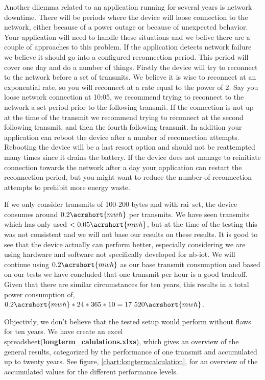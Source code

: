 \documentclass[USenglish]{ifimaster}  %
\begin{document}
Another dilemma related to an application running for several years is network downtime. There will be periods where the device will loose connection to the network, either because of a power outage or because of unexpected behavior. Your application will need to handle these situations and we belive there are a couple of approaches to this problem. If the application detects network failure we believe it should go into a configured reconnection period. This period will cover one day and do a number of things. Firstly the device will try to reconnect to the network before a set of transmits. We believe it is wise to reconnect at an exponential rate, so you will reconnect at a rate equal to the power of 2. Say you loose network connection at 10:05, we recommend trying to reconnect to the network a set period prior to the following transmit. If the connection is not up at the time of the transmit we recommend trying to reconnect at the second following transmit, and then the fourth following transmit. In addition your application can reboot the device after a number of reconnection attempts. Rebooting the device will be a last resort option and should not be reattempted many times since it drains the battery. If the device does not manage to reinitiate connection towards the network after a day your application can restart the reconnection period, but you might want to reduce the number of reconnection attempts to prehibit more energy waste.

If we only consider transmits of 100-200 bytes and with \acrshort{rai} set, the device consumes around ${0.2 \acrshort{mwh}}$ per transmits\cite{online:result8}. We have seen transmits which has only used ${<0.05 \acrshort{mwh}}$\cite{online:result12}, but at the time of the testing this was not consistent and we will not base our results on these results. It is good to see that the device actually can perform better, especially considering we are using hardware and software not specifically developed for \acrshort{nb-iot}.
We will continue using ${0.2 \acrshort{mwh}}$ as our base transmit consumption and based on our tests we have concluded that one transmit per hour is a good tradeoff. Given that there are similar circumstances for ten years, this results in a total power consumption of, ${0.2\acrshort{mwh} * 24 * 365 * 10 = 17 520 \acrshort{mwh}}$.

Objectivly, we don't believe that the tested setup would perform without flaws for ten years. We have create an excel spreadsheet(\textbf{longterm\_calulations.xlxs}), which gives an overview of the general results, categorized by the performance of one transmit and accumulated up to twenty years. See figure, \vref{chart:longtermcalculation}, for an overview of the accumulated values for the different performance levels.
\end{document}
